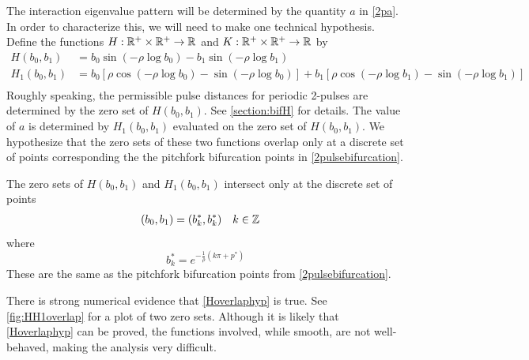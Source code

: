 \documentclass[thesis.tex]{subfiles}
\begin{document}
The interaction eigenvalue pattern will be determined by the quantity $a$ in \cref{2pa}. In order to characterize this, we will need to make one technical hypothesis. Define the functions $H: \mathbb{R}^+ \times \mathbb{R}^+ \rightarrow \mathbb{R}$ and $K: \mathbb{R}^+ \times \mathbb{R}^+ \rightarrow \mathbb{R}$ by 
\begin{align}
H(b_0, b_1) &= b_0 \sin \left( -\rho \log b_0 \right) - b_1 \sin \left( -\rho \log b_1 \right) \label{perdefH} \\
H_1(b_0, b_1) &= b_0 \left[ \rho \cos \left( -\rho \log b_0 \right) - \sin \left( -\rho \log b_0 \right) \right] + b_1 \left[ \rho \cos \left( -\rho \log b_1 \right) - \sin \left( -\rho \log b_1 \right) \right]  \label{perdefH1} \\
\end{align}
Roughly speaking, the permissible pulse distances for periodic 2-pulses are determined by the zero set of $H(b_0, b_1)$. See \cref{section:bifH} for details. The value of $a$ is determined by $H_1(b_0, b_1)$ evaluated on the zero set of $H(b_0, b_1)$. We hypothesize that the zero sets of these two functions overlap only at a discrete set of points corresponding the the pitchfork bifurcation points in \cref{2pulsebifurcation}.

\begin{hypothesis}\label{Hoverlaphyp}
The zero sets of $H(b_0, b_1)$ and $H_1(b_0, b_1)$ intersect only at the discrete set of points
\begin{align*}
(b_0, b_1) &= (b_k^*, b_k^*) && k \in \mathbb{Z}
\end{align*}
where 
\begin{equation*}
b^*_k = e^{-\frac{1}{\rho} (k \pi + p^*) }
\end{equation*}
These are the same as the pitchfork bifurcation points from \cref{2pulsebifurcation}.
\end{hypothesis}

\begin{remark}There is strong numerical evidence that \cref{Hoverlaphyp} is true. See \cref{fig:HH1overlap} for a plot of two zero sets. Although it is likely that \cref{Hoverlaphyp} can be proved, the functions involved, while smooth, are not well-behaved, making the analysis very difficult.
\end{remark}
\end{document}
